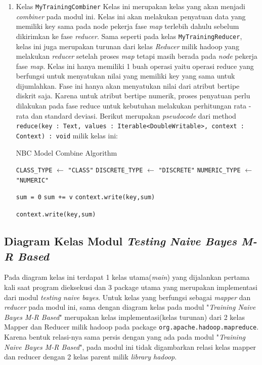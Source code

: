 \begin{enumerate}
\item Kelas \texttt{MyTrainingCombiner}
Kelas ini merupakan kelas yang akan menjadi \textit{combiner} pada modul ini. Kelas ini akan melakukan penyatuan data yang memiliki key sama pada node pekerja fase \textit{map} terlebih dahulu sebelum dikirimkan ke fase \textit{reducer}. Sama seperti pada kelas \texttt{MyTrainingReducer}, kelas ini juga merupakan turunan dari kelas \textit{Reducer} milik hadoop yang melakukan \textit{reducer} setelah proses \textit{map} tetapi masih berada pada \textit{node} pekerja fase \textit{map}. Kelas ini hanya memiliki 1 buah operasi yaitu operasi reduce yang berfungsi untuk menyatukan nilai yang memiliki key yang sama untuk dijumlahkan. Fase ini hanya akan menyatukan nilai dari atribut bertipe diskrit saja. Karena untuk atribut bertipe numerik, proses penyatuan perlu dilakukan pada fase reduce untuk kebutuhan melakukan perhitungan rata - rata dan standard deviasi. Berikut merupakan \textit{pseudocode} dari method \texttt{reduce(key : Text, values : Iterable<DoubleWritable>, context : Context) : void} milik kelas ini:

\begin{algorithm}[H]
\caption{NBC Model Combine Algorithm}\label{alg:NBCGenCombine}
\begin{algorithmic}[1]

\State \verb|CLASS_TYPE| $\gets$ \texttt{"CLASS"}
\State \verb|DISCRETE_TYPE| $\gets$ \texttt{"DISCRETE"}
\State \verb|NUMERIC_TYPE| $\gets$ \texttt{"NUMERIC"}

	\State \texttt{sum = 0}
		\State \texttt{sum += v}
	\EndFor
	\State \texttt{context.write(key,sum)}
	
		\State \texttt{context.write(key,sum)}
	\EndFor
\EndIf

\EndProcedure
\end{algorithmic}
\end{algorithm}


\end{enumerate}

\subsection{Diagram Kelas Modul \textit{Testing Naive Bayes M-R Based}}
Pada diagram kelas ini terdapat 1 kelas utama(\textit{main}) yang dijalankan pertama kali saat program dieksekusi dan 3 package utama yang merupakan implementasi dari modul \textit{testing naive bayes}. Untuk kelas yang berfungsi sebagai \textit{mapper} dan \textit{reducer} pada modul ini, sama dengan diagram kelas pada modul "\textit{Training Naive Bayes M-R Based}" merupakan kelas implementasi(kelas turunan) dari 2 kelas Mapper dan Reducer milik hadoop pada package \verb|org.apache.hadoop.mapreduce|. Karena bentuk relasi-nya sama persis dengan yang ada pada modul "\textit{Training Naive Bayes M-R Based}", pada modul ini tidak digambarkan relasi kelas mapper dan reducer dengan 2 kelas parent milik \textit{library hadoop}.

